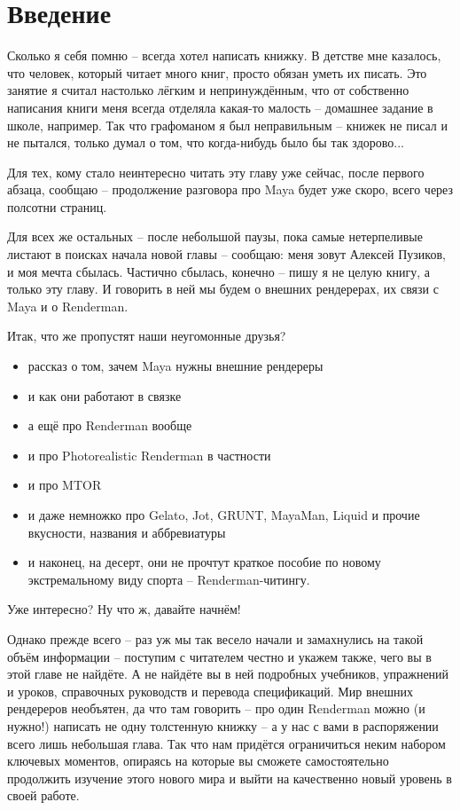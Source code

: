\chapter*{Введение}

Сколько я себя помню – всегда хотел написать книжку. В детстве мне казалось, что человек, который читает много книг, просто обязан уметь их писать. Это занятие я считал
настолько лёгким и непринуждённым, что от собственно написания книги меня всегда отделяла какая-то малость – домашнее задание в школе, например. Так что графоманом я
был неправильным – книжек не писал и не пытался, только думал о том, что когда-нибудь было бы так здорово...

Для тех, кому стало неинтересно читать эту главу уже сейчас, после первого абзаца, сообщаю – продолжение разговора про Maya будет уже скоро, всего через полсотни
страниц.

Для всех же остальных – после небольшой паузы, пока самые нетерпеливые листают в поисках начала новой главы – сообщаю: меня зовут Алексей Пузиков, и моя мечта сбылась.
Частично сбылась, конечно – пишу я не целую книгу, а только эту главу. И говорить в ней мы будем о внешних рендерерах, их связи с Maya и о Renderman.

Итак, что же пропустят наши неугомонные друзья?
\begin{itemize}
\item рассказ о том, зачем Maya нужны внешние рендереры
\item и как они работают в связке
\item а ещё про Renderman вообще
\item и про Photorealistic Renderman в частности
\item и про MTOR
\item и даже немножко про Gelato, Jot, GRUNT, MayaMan, Liquid и прочие вкусности, названия и аббревиатуры
\item и наконец, на десерт, они не прочтут краткое пособие по новому экстремальному виду спорта – Renderman-читингу.
\end{itemize}

Уже интересно? Ну что ж, давайте начнём!

Однако прежде всего – раз уж мы так весело начали и замахнулись на такой объём информации – поступим с читателем честно и укажем также, чего вы в этой главе не
найдёте. А не найдёте вы в ней подробных учебников, упражнений и уроков, справочных руководств и перевода спецификаций. Мир внешних рендереров необъятен, да что там
говорить – про один Renderman можно (и нужно!) написать не одну толстенную книжку – а у нас с вами в распоряжении всего лишь небольшая глава. Так что нам придётся
ограничиться неким набором ключевых моментов, опираясь на которые вы сможете самостоятельно продолжить изучение этого нового мира и выйти на качественно новый уровень в
своей работе.

